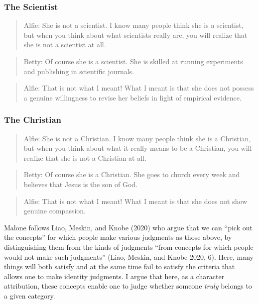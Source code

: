 \documentclass[
  letterpaper,
  DIV=11,
  numbers=noendperiod]{scrreprt}
\begin{document}
\begin{tcolorbox}[enhanced jigsaw, arc=.35mm, breakable, rightrule=.15mm, colback=white, colframe=quarto-callout-important-color-frame, bottomrule=.15mm, leftrule=.75mm, opacityback=0, toprule=.15mm, left=2mm]
\begin{tcolorbox}[enhanced jigsaw, arc=.35mm, breakable, rightrule=.15mm, colback=white, colframe=quarto-callout-tip-color-frame, bottomrule=.15mm, leftrule=.75mm, opacityback=0, toprule=.15mm, left=2mm]
\subsubsection{The Scientist}\label{the-scientist}

\begin{quote}
Alfie: She is not a scientist. I know many people think she is a
scientist, but when you think about what scientists really are, you will
realize that she is not a scientist at all.
\end{quote}

\begin{quote}
Betty: Of course she is a scientist. She is skilled at running
experiments and publishing in scientific journals.
\end{quote}

\begin{quote}
Alfie: That is not what I meant! What I meant is that she does not
possess a genuine willingness to revise her beliefs in light of
empirical evidence.
\end{quote}

\subsubsection{The Christian}\label{the-christian}

\begin{quote}
Alfie: She is not a Christian. I know many people think she is a
Christian, but when you think about what it really means to be a
Christian, you will realize that she is not a Christian at all.
\end{quote}

\begin{quote}
Betty: Of course she is a Christian. She goes to church every week and
believes that Jesus is the son of God.
\end{quote}

\begin{quote}
Alfie: That is not what I meant! What I meant is that she does not show
genuine compassion.
\end{quote}

Malone follows Liao, Meskin, and Knobe (2020) who argue that we can
``pick out the concepts'' for which people make various judgments as
those above, by distinguishing them from the kinds of judgments ``from
concepts for which people would not make such judgments'' (Liao, Meskin,
and Knobe 2020, 6). Here, many things will both satisfy and at the same
time fail to satisfy the criteria that allows one to make identity
judgments. I argue that here, as a character attribution, these concepts
enable one to judge whether someone \emph{truly} belongs to a given
category.


\end{tcolorbox}
\end{tcolorbox}
\end{document}
